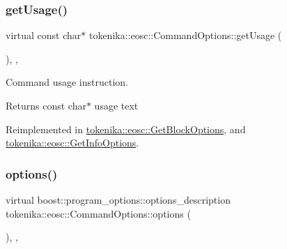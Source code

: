\mbox{\label{classtokenika_1_1eosc_1_1_command_options_a18ada0ba1163f7a41c9990ae2756012b}} 
\subsubsection{\texorpdfstring{get\+Usage()}{getUsage()}}
{\footnotesize\ttfamily virtual const char$\ast$ tokenika\+::eosc\+::\+Command\+Options\+::get\+Usage (\begin{DoxyParamCaption}{ }\end{DoxyParamCaption})\hspace{0.3cm}{\ttfamily [inline]}, {\ttfamily [protected]}, {\ttfamily [virtual]}}



Command \textquotesingle{}usage\textquotesingle{} instruction. 

\begin{DoxyReturn}{Returns}
const char$\ast$ usage text 
\end{DoxyReturn}


Reimplemented in \hyperlink{classtokenika_1_1eosc_1_1_get_block_options_ab0b7572223d35a3232630b9eef51b9cb}{tokenika\+::eosc\+::\+Get\+Block\+Options}, and \hyperlink{classtokenika_1_1eosc_1_1_get_info_options_aad995529f121f42cdd8f0b1380540370}{tokenika\+::eosc\+::\+Get\+Info\+Options}.

\mbox{\label{classtokenika_1_1eosc_1_1_command_options_aa55960f380250eb7065cb6489b67196f}} 
\subsubsection{\texorpdfstring{options()}{options()}}
{\footnotesize\ttfamily virtual boost\+::program\+\_\+options\+::options\+\_\+description tokenika\+::eosc\+::\+Command\+Options\+::options (\begin{DoxyParamCaption}{ }\end{DoxyParamCaption})\hspace{0.3cm}{\ttfamily [inline]}, {\ttfamily [protected]}, {\ttfamily [virtual]}}



